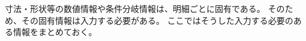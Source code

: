 




寸法・形状等の数値情報や条件分岐情報は、明細ごとに固有である。
そのため、その固有情報は入力する必要がある。
ここではそうした入力する必要のある情報をまとめておく。




\begin{appendices}


\end{appendices}
\clearrightpage
